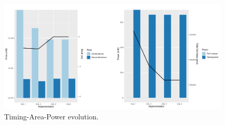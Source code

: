 \documentclass[10pt,times,mathptm,psfig,final,journal,comsoc]{IEEEtran}
\begin{document}
\begin{figure}[ht!]
	\centering
	\includegraphics[width=0.85\linewidth]{Diagramas/areaTiempoPower.pdf}
	\caption{Timing-Area-Power evolution.}
	\label{fig:atp}
\end{figure}



\newpage


\end{document}
